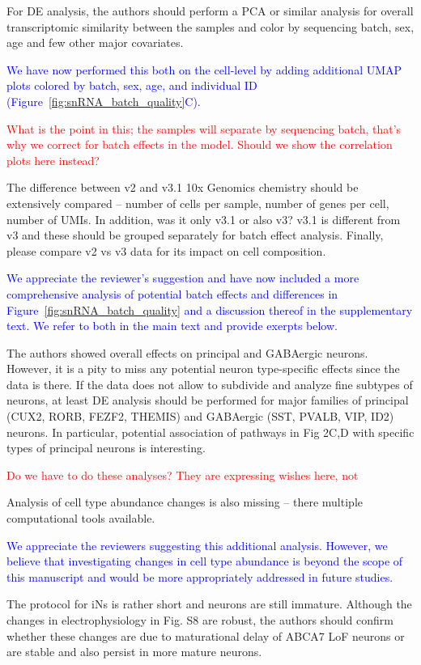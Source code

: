 For DE analysis, the authors should perform a PCA or similar analysis for overall transcriptomic similarity between the samples and color by sequencing batch, sex, age and few other major covariates.

\textcolor{blue}{We have now performed this both on the cell-level by adding additional UMAP plots colored by batch, sex, age, and individual ID (Figure~\ref{fig:snRNA_batch_quality}C).}

\textcolor{red}{What is the point in this; the samples will separate by sequencing batch, that's why we correct for batch effects in the model. Should we show the correlation plots here instead?}

The difference between v2 and v3.1 10x Genomics chemistry should be extensively compared – number of cells per sample, number of genes per cell, number of UMIs. In addition, was it only v3.1 or also v3? v3.1 is different from v3 and these should be grouped separately for batch effect analysis. Finally, please compare v2 vs v3 data for its impact on cell composition.

\textcolor{blue}{We appreciate the reviewer's suggestion and have now included a more comprehensive analysis of potential batch effects and differences in Figure~\ref{fig:snRNA_batch_quality} and a discussion thereof in the supplementary text. We refer to both in the main text and provide exerpts below.}

The authors showed overall effects on principal and GABAergic neurons. However, it is a pity to miss any potential neuron type-specific effects since the data is there. If the data does not allow to subdivide and analyze fine subtypes of neurons, at least DE analysis should be performed for major families of principal (CUX2, RORB, FEZF2, THEMIS) and GABAergic (SST, PVALB, VIP, ID2) neurons. In particular, potential association of pathways in Fig 2C,D with specific types of principal neurons is interesting.

\textcolor{red}{Do we have to do these analyses? They are expressing wishes here, not }

Analysis of cell type abundance changes is also missing – there multiple computational tools available.

\textcolor{blue}{We appreciate the reviewers suggesting this additional analysis. However, we believe that investigating changes in cell type abundance is beyond the scope of this manuscript and would be more appropriately addressed in future studies.}

The protocol for iNs is rather short and neurons are still immature. Although the changes in electrophysiology in Fig. S8 are robust, the authors should confirm whether these changes are due to maturational delay of ABCA7 LoF neurons or are stable and also persist in more mature neurons.

